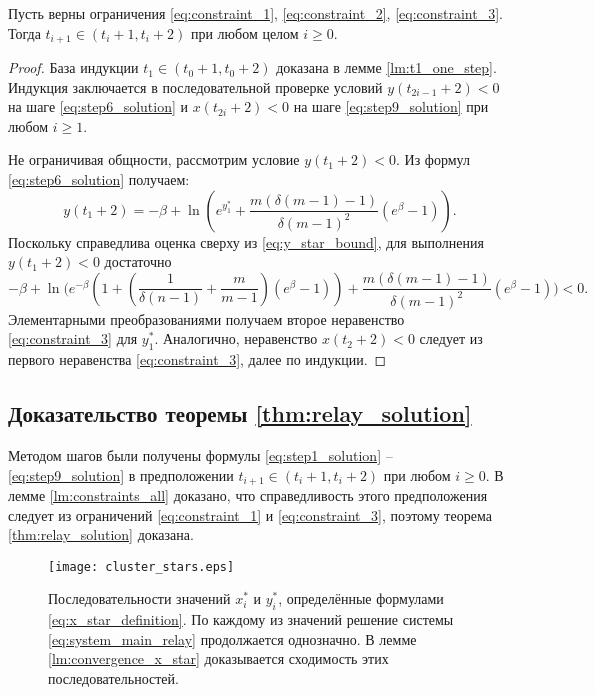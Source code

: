 \begin{lemma}
	\label{lm:constraints_all}
	Пусть верны ограничения \eqref{eq:constraint_1}, \eqref{eq:constraint_2}, \eqref{eq:constraint_3}. Тогда $t_{i + 1} \in (t_i + 1, t_i + 2)$ при любом целом $i \geqslant 0$.
\end{lemma}
\begin{proof}
	
	База индукции $t_1 \in (t_0 + 1, t_0 + 2)$ доказана в лемме \eqref{lm:t1_one_step}. Индукция заключается в последовательной проверке условий $y(t_{2i - 1} + 2) < 0$ на шаге \eqref{eq:step6_solution} и $x(t_{2i} + 2) < 0$ на шаге \eqref{eq:step9_solution} при любом $i \geqslant 1$.
	
	Не ограничивая общности, рассмотрим условие $y(t_1 + 2) < 0$. Из формул \eqref{eq:step6_solution} получаем:
	\[
	y(t_1 + 2) = -\beta + \ln\left(e^{y_1^*} + \frac{m(\delta(m - 1) - 1)}{\delta (m - 1)^2}(e^\beta - 1) \right).
	\]
	Поскольку справедлива оценка сверху из \eqref{eq:y_star_bound}, для выполнения $y(t_1 + 2) < 0$ достаточно
	\[
	-\beta + \ln\Bigg(e^{-\beta} \left(1 + \left( \dfrac{1}{\delta(n - 1)} + \dfrac{m}{m - 1} \right)(e^{\beta} - 1)\right) + \frac{m(\delta(m - 1) - 1)}{\delta (m - 1)^2} (e^\beta - 1) \Bigg) < 0.
	\]
	Элементарными преобразованиями получаем второе неравенство \eqref{eq:constraint_3} для $y_1^*$. Аналогично, неравенство $x(t_2 + 2) < 0$ следует из первого неравенства \eqref{eq:constraint_3}, далее по индукции.
\end{proof}

\subsection{Доказательство теоремы \ref{thm:relay_solution}} 
Методом шагов были получены формулы \eqref{eq:step1_solution} -- \eqref{eq:step9_solution} в предположении $t_{i + 1} \in (t_i + 1, t_i + 2)$ при любом $i \geqslant 0$. В лемме \ref{lm:constraints_all} доказано, что справедливость этого предположения следует из ограничений \eqref{eq:constraint_1} и \eqref{eq:constraint_3}, поэтому теорема \ref{thm:relay_solution} доказана.

\begin{figure}
	\centering
	\texttt{[image: cluster\_stars.eps]}
	\caption{Последовательности значений $x^*_i$ и $y^*_i$, определённые формулами \eqref{eq:x_star_definition}. По каждому из значений решение системы \eqref{eq:system_main_relay} продолжается однозначно. В лемме \ref{lm:convergence_x_star} доказывается сходимость этих последовательностей.}
	\label{fig:x_star}
\end{figure}

